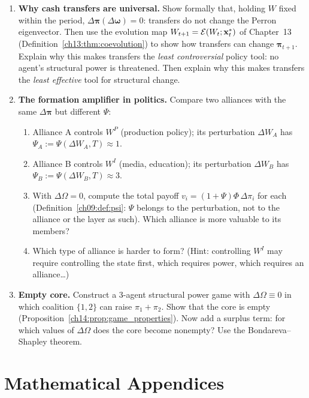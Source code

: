 \documentclass[../structural_economics_book.tex]{subfiles}
\begin{document}
\begin{enumerate}[label=\textbf{14.\arabic*}, leftmargin=3em]
\item \textbf{Why cash transfers are universal.} Show formally that, holding $W$ fixed within the period, $\Delta\boldsymbol{\pi}(\Delta\boldsymbol{\omega}) = 0$: transfers do not change the Perron eigenvector. Then use the evolution map $W_{t+1} = \mathcal{E}(W_t; \mathbf{x}^*_t)$ of Chapter~13 (Definition~\ref{ch13:thm:coevolution}) to show how transfers can change $\boldsymbol{\pi}_{t+1}$. Explain why this makes transfers the \textit{least controversial} policy tool: no agent's structural power is threatened. Then explain why this makes transfers the \textit{least effective} tool for structural change.

\item \textbf{The formation amplifier in politics.} Compare two alliances with the same $\Delta\boldsymbol{\pi}$ but different $\Psi$:
\begin{enumerate}
\item Alliance A controls $W^P$ (production policy); its perturbation $\Delta W_A$ has $\Psi_A := \Psi(\Delta W_A, T) \approx 1$.
\item Alliance B controls $W^I$ (media, education); its perturbation $\Delta W_B$ has $\Psi_B := \Psi(\Delta W_B, T) \approx 3$.
\item With $\Delta\Omega = 0$, compute the total payoff $v_i = (1+\Psi)\Phi\,\Delta\pi_i$ for each (Definition~\ref{ch09:def:psi}: $\Psi$ belongs to the perturbation, not to the alliance or the layer as such). Which alliance is more valuable to its members?
\item Which type of alliance is harder to form? (Hint: controlling $W^I$ may require controlling the state first, which requires power, which requires an alliance\ldots)
\end{enumerate}

\item \textbf{Empty core.} Construct a 3-agent structural power game with $\Delta\Omega \equiv 0$ in which coalition $\{1,2\}$ can raise $\pi_1 + \pi_2$. Show that the core is empty (Proposition~\ref{ch14:prop:game_properties}). Now add a surplus term: for which values of $\Delta\Omega$ does the core become nonempty? Use the Bondareva--Shapley theorem.
\end{enumerate}


\newpage
\section*{Mathematical Appendices}
\end{document}
